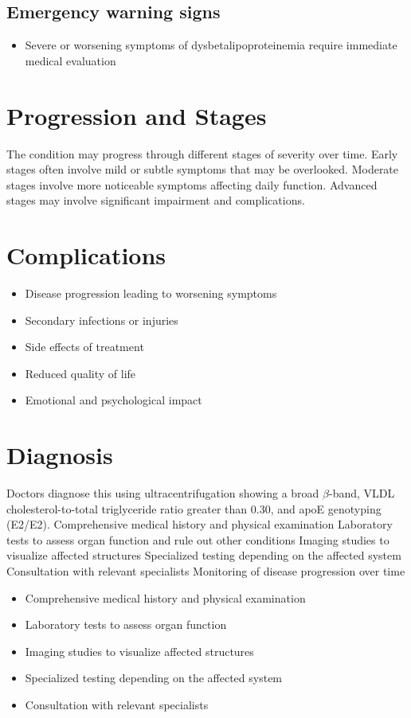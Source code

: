 \subsection{Emergency warning signs}
\begin{itemize}[noitemsep]
  \item Severe or worsening symptoms of dysbetalipoproteinemia require immediate medical evaluation
\end{itemize}
\section{Progression and Stages}
The condition may progress through different stages of severity over time. Early stages often involve mild or subtle symptoms that may be overlooked. Moderate stages involve more noticeable symptoms affecting daily function. Advanced stages may involve significant impairment and complications.
\section{Complications}
\begin{itemize}[noitemsep]
  \item Disease progression leading to worsening symptoms
  \item Secondary infections or injuries
  \item Side effects of treatment
  \item Reduced quality of life
  \item Emotional and psychological impact
\end{itemize}
\section{Diagnosis}
Doctors diagnose this using ultracentrifugation showing a broad $\beta$-band, VLDL cholesterol-to-total triglyceride ratio greater than 0.30, and apoE genotyping (E2/E2). Comprehensive medical history and physical examination Laboratory tests to assess organ function and rule out other conditions Imaging studies to visualize affected structures Specialized testing depending on the affected system Consultation with relevant specialists Monitoring of disease progression over time

\begin{itemize}[noitemsep]
  \item Comprehensive medical history and physical examination
  \item Laboratory tests to assess organ function
  \item Imaging studies to visualize affected structures
  \item Specialized testing depending on the affected system
  \item Consultation with relevant specialists
\end{itemize}
